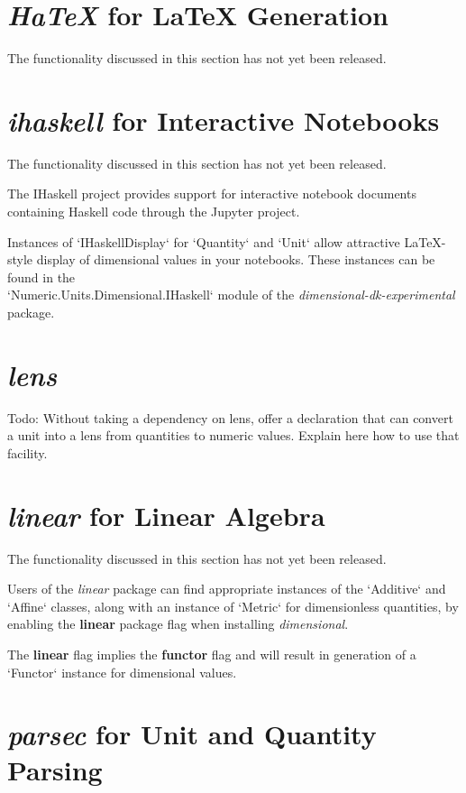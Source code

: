\documentclass[11pt]{report}
\newcommand{\packagename}[1]{\textit{#1}}
\newcommand{\thispackage}{\packagename{dimensional}}
\newcommand{\experimentalpackage}{\packagename{dimensional-dk-experimental}}
\newcommand{\flag}[1]{\textbf{#1}}
\newcommand{\prerelease}{\begin{framed}
The functionality discussed in this section has not yet been released.
\end{framed}}
\begin{document}
\section{\packagename{HaTeX} for \LaTeX{} Generation}

\prerelease{}

\section{\packagename{ihaskell} for Interactive Notebooks}

\prerelease{}

The IHaskell project provides support for interactive notebook documents containing
Haskell code through the Jupyter project.

Instances of `IHaskellDisplay` for `Quantity` and `Unit`
allow attractive \LaTeX{}-style display of dimensional values in your notebooks. These
instances can be found in the \\
`Numeric.Units.Dimensional.IHaskell` module of the \experimentalpackage{}
package.

\section{\packagename{lens}}

Todo: Without taking a dependency on lens, offer a declaration that can convert a unit into a lens from quantities to numeric values.
Explain here how to use that facility.

\section{\packagename{linear} for Linear Algebra}

\prerelease{}

Users of the \packagename{linear} package can find appropriate instances of
the `Additive` and `Affine` classes, along with an
instance of `Metric` for dimensionless quantities, by enabling the \flag{linear}
package flag when installing \thispackage{}.

The \flag{linear} flag implies the \flag{functor} flag and will result in generation of a `Functor`
instance for dimensional values.

\section{\packagename{parsec} for Unit and Quantity Parsing}
\end{document}
